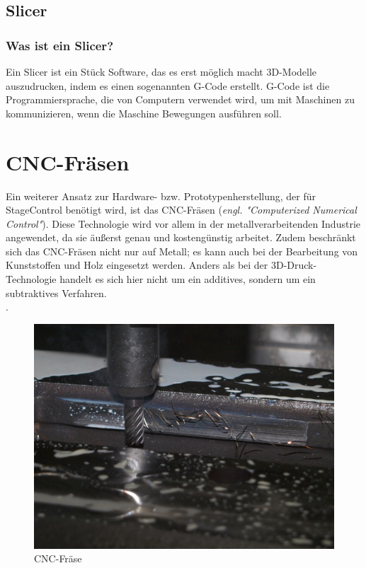 \subsection{Slicer}
\subsubsection{Was ist ein Slicer?}
Ein Slicer ist ein Stück Software, das es erst möglich macht 3D-Modelle auszudrucken, indem es einen sogenannten G-Code erstellt. G-Code ist die Programmiersprache, die von Computern verwendet wird, um mit Maschinen zu kommunizieren, wenn die Maschine Bewegungen ausführen soll. \\
\cite{Slicer_G-Code}


\section{CNC-Fräsen}

Ein weiterer Ansatz zur Hardware- bzw. Prototypenherstellung, der für StageControl benötigt wird, ist das CNC-Fräsen (\emph{engl. "Computerized Numerical Control"}). Diese Technologie wird vor allem in der metallverarbeitenden Industrie angewendet, da sie äußerst genau und kostengünstig arbeitet. Zudem beschränkt sich das CNC-Fräsen nicht nur auf Metall; es kann auch bei der Bearbeitung von Kunststoffen und Holz eingesetzt werden. Anders als bei der 3D-Druck-Technologie handelt es sich hier nicht um ein additives, sondern um ein subtraktives Verfahren.\\
 \cite{CNC-Fraesen} \cite{CNC-Fraesen_2} \cite{CNC-Fraesen_3}.


\begin{figure}[H]
	\centering
	\includegraphics[width=0.8\linewidth]{images/CNC.jpg}
	\caption[CNC-Fräse]{CNC-Fräse}
	\label{fig:cnc-fraese}
\end{figure}

